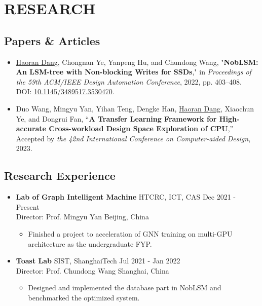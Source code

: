 \documentclass[a4paper,10pt]{ctexart} %
\begin{document}
\section{RESEARCH}

    \subsection{Papers \& Articles}

        \begin{itemize}
            \item \underline{Haoran Dang}, Chongnan Ye, Yanpeng Hu, and Chundong Wang, "\textbf{NobLSM: An LSM-tree with Non-blocking Writes for SSDs}," in \textit{Proceedings of the 59th ACM/IEEE Design Automation Conference}, 2022, pp. 403–408. DOI: \href{https://doi.org/10.1145/3489517.3530470}{10.1145/3489517.3530470}.
            \item Duo Wang, Mingyu Yan, Yihan Teng, Dengke Han, \underline{Haoran Dang}, Xiaochun Ye, and Dongrui Fan, “\textbf{A Transfer Learning Framework for High-accurate Cross-workload Design Space Exploration of CPU},” Accepted by \textit{the 42nd International Conference on Computer-aided Design}, 2023.
        \end{itemize}

    \subsection{Research Experience}

    \begin{itemize}
        \item \textbf{Lab of Graph Intelligent Machine} \quad HTCRC, ICT, CAS \hfill Dec 2021 - Present \\
        {\small Director: Prof. Mingyu Yan} \hfill Beijing, China
        \begin{small}
            \begin{itemize}
                \item Finished a project to acceleration of GNN training on multi-GPU architecture as the undergraduate FYP.
            \end{itemize}
        \end{small}
    \end{itemize}

    \begin{itemize}
        \item \textbf{Toast Lab} \quad SIST, ShanghaiTech \hfill Jul 2021 - Jan 2022 \\
        {\small Director: Prof. Chundong Wang} \hfill Shanghai, China
        \begin{small}
            \begin{itemize}
                \item Designed and implemented the database part in NobLSM and benchmarked the optimized system.
            \end{itemize}
        \end{small}
    \end{itemize}
\end{document}
